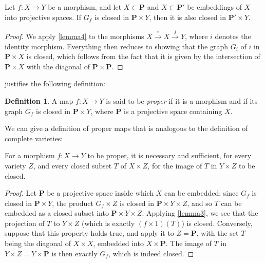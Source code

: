 \documentclass{article}
\theoremstyle{plain}
\newenvironment{proposition}[1]
    {\renewcommand\theinnercustomproposition{#1}\innercustomproposition}
    {\endinnercustomproposition}
\newenvironment{lemma}[1]
    {\renewcommand\theinnercustomlemma{#1}\innercustomlemma}
    {\endinnercustomlemma}
\theoremstyle{definition}
\newtheorem*{definition}{Definition}
\newcommand{\PP}{\mathbf{P}}
\newcommand{\oldpage}[1]{\marginpar{\footnotesize$\Big\vert$ \textit{p.~#1}}}
\begin{document}
\begin{lemma}{5}
\label{lemma5}
  Let $f\colon X\to Y$ be a morphism, and let $X\subset \PP$ and $X\subset \PP'$ be embeddings of $X$ into projective spaces.
  If $G_f$ is closed in $\PP\times Y$, then it is also closed in $\PP'\times Y$.
\end{lemma}

\begin{proof}
  We apply \cref{lemma4} to the morphisms $X\xrightarrow{i}X\xrightarrow{f}Y$, where $i$ denotes the identity morphism.
  Everything then reduces to showing that the graph $G_i$ of $i$ in $\PP\times X$ is closed, which follows from the fact that it is given by the intersection of $\PP\times X$ with the diagonal of $\PP\times \PP$.
\end{proof}

 justifies the following definition:

\begin{definition}
  A map $f\colon X\to Y$ is said to be \emph{proper} if it is a morphism and if its graph $G_f$ is closed in $\PP\times Y$, where $\PP$ is a projective space containing $X$.
\end{definition}

We can give a definition of proper maps that is analogous to the definition of complete varieties:

\begin{proposition}{3}
\label{proposition3}
  For a morphism $f\colon X\to Y$ to be proper, it is necessary and sufficient, for every variety $Z$, and every closed subset $T$ of $X\times Z$, for the image of $T$ in $Y\times Z$ to be closed.
\end{proposition}

\begin{proof}
  Let $\PP$ be a projective space inside which $X$ can be embedded;
  since $G_f$ is closed in $\PP\times Y$, the product $G_f\times Z$ is closed in $\PP\times Y\times Z$, and so $T$ can be embedded as a closed subset into $\PP\times Y\times Z$.
\oldpage{101}
  Applying \cref{lemma3}, we see that the projection of $T$ to $Y\times Z$ (which is exactly $(f\times1)(T)$) is closed.
  Conversely, suppose that this property holds true, and apply it to $Z=\PP$, with the set $T$ being the diagonal of $X\times X$, embedded into $X\times \PP$.
  The image of $T$ in $Y\times Z=Y\times \PP$ is then exactly $G_f$, which is indeed closed.
\end{proof}
\end{document}
